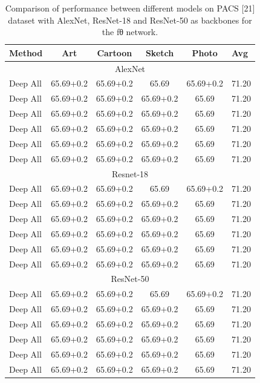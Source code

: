 \documentclass[review]{cvpr}
\begin{document}
\begin{table}
\small
  \label{tab:tab1}
  \begin{tabular}{lccccl}
   \hline
    Method & Art &Cartoon & Sketch & Photo &Avg\\
    \hline
    \multicolumn{6}{c}{AlexNet} \\
    \hline
   Deep All & \small{65.69+0.2} &65.69+0.2 &65.69&65.69+0.2 & 71.20 \\ \hline
   Deep All & 65.69+0.2 &65.69+0.2 &65.69+0.2&65.69 & 71.20 \\ \hline
   Deep All & 65.69+0.2 &65.69+0.2 &65.69+0.2&65.69 & 71.20 \\ \hline
   Deep All & 65.69+0.2 &65.69+0.2 &65.69+0.2&65.69 & 71.20 \\ \hline
   Deep All & 65.69+0.2 &65.69+0.2 &65.69+0.2&65.69 & 71.20 \\ \hline
   Deep All & 65.69+0.2 &65.69+0.2 &65.69+0.2&65.69 & 71.20 \\ \hline
   \multicolumn{6}{c}{Resnet-18} \\
    \hline
     Deep All & \small{65.69+0.2} &65.69+0.2 &65.69&65.69+0.2 & 71.20 \\ \hline
   Deep All & 65.69+0.2 &65.69+0.2 &65.69+0.2&65.69 & 71.20 \\ \hline
   Deep All & 65.69+0.2 &65.69+0.2 &65.69+0.2&65.69 & 71.20 \\ \hline
   Deep All & 65.69+0.2 &65.69+0.2 &65.69+0.2&65.69 & 71.20 \\ \hline
   Deep All & 65.69+0.2 &65.69+0.2 &65.69+0.2&65.69 & 71.20 \\ \hline
   Deep All & 65.69+0.2 &65.69+0.2 &65.69+0.2&65.69 & 71.20 \\ \hline
   \multicolumn{6}{c}{ResNet-50} \\
    \hline
     Deep All & \small{65.69+0.2} &65.69+0.2 &65.69&65.69+0.2 & 71.20 \\ \hline
   Deep All & 65.69+0.2 &65.69+0.2 &65.69+0.2&65.69 & 71.20 \\ \hline
   Deep All & 65.69+0.2 &65.69+0.2 &65.69+0.2&65.69 & 71.20 \\ \hline
   Deep All & 65.69+0.2 &65.69+0.2 &65.69+0.2&65.69 & 71.20 \\ \hline
   Deep All & 65.69+0.2 &65.69+0.2 &65.69+0.2&65.69 & 71.20 \\ \hline
   Deep All & 65.69+0.2 &65.69+0.2 &65.69+0.2&65.69 & 71.20 \\ \hline
\end{tabular}
\caption{Comparison of performance between different
models on PACS [21] dataset with AlexNet, ResNet-18 and
ResNet-50 as backbones for the fθ network.}
\end{table}
\end{document}
